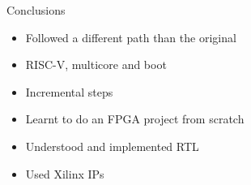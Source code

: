 
\begin{frame}{Conclusions}
    \begin{itemize}
        \item Followed a different path than the original
        \item RISC-V, multicore and boot
        \item Incremental steps
        \item Learnt to do an FPGA project from scratch
        \item Understood and implemented RTL
        \item Used Xilinx IPs
    \end{itemize}
\end{frame}

